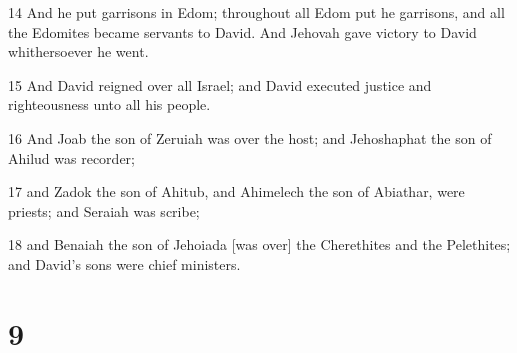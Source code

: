 \par 14 And he put garrisons in Edom; throughout all Edom put he garrisons, and all the Edomites became servants to David. And Jehovah gave victory to David whithersoever he went.
\par 15 And David reigned over all Israel; and David executed justice and righteousness unto all his people.
\par 16 And Joab the son of Zeruiah was over the host; and Jehoshaphat the son of Ahilud was recorder;
\par 17 and Zadok the son of Ahitub, and Ahimelech the son of Abiathar, were priests; and Seraiah was scribe;
\par 18 and Benaiah the son of Jehoiada [was over] the Cherethites and the Pelethites; and David's sons were chief ministers.

\chapter{9}

